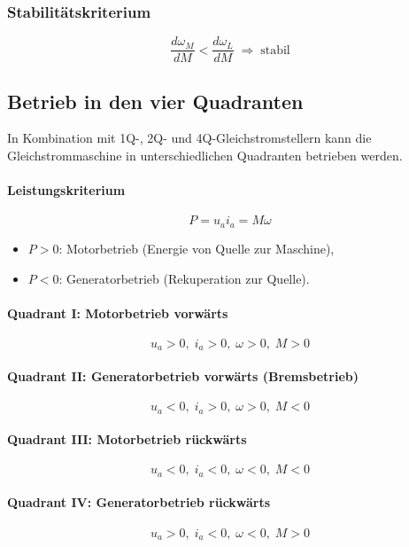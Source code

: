 \subsubsection{Stabilitätskriterium}

\[
\boxed{\frac{d\omega_M}{dM} < \frac{d\omega_L}{dM}\;\Rightarrow\;\text{stabil}}
\]


\subsection{Betrieb in den vier Quadranten}

In Kombination mit 1Q-, 2Q- und 4Q-Gleichstromstellern kann die Gleichstrommaschine
in unterschiedlichen Quadranten betrieben werden.

\paragraph{Leistungskriterium}
\[
\boxed{P=u_a i_a=M\omega}
\]

\begin{itemize}
\item $P>0$: Motorbetrieb (Energie von Quelle zur Maschine),
\item $P<0$: Generatorbetrieb (Rekuperation zur Quelle).
\end{itemize}

\paragraph{Quadrant I: Motorbetrieb vorwärts}
\[
\boxed{u_a>0,\; i_a>0,\; \omega>0,\; M>0}
\]

\paragraph{Quadrant II: Generatorbetrieb vorwärts (Bremsbetrieb)}
\[
\boxed{u_a<0,\; i_a>0,\; \omega>0,\; M<0}
\]

\paragraph{Quadrant III: Motorbetrieb rückwärts}
\[
\boxed{u_a<0,\; i_a<0,\; \omega<0,\; M<0}
\]

\paragraph{Quadrant IV: Generatorbetrieb rückwärts}
\[
\boxed{u_a>0,\; i_a<0,\; \omega<0,\; M>0}
\]

